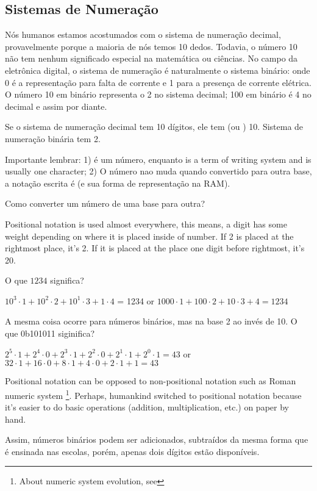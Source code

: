 \subsection{Sistemas de Numeração}

Nós humanos estamos acostumados com o sistema de numeração decimal, provavelmente porque a maioria de nós temos 10 dedos.
Todavia, o número 10 não tem nenhum significado especial na matemática ou ciências.
No campo da eletrônica digital, o sistema de numeração é naturalmente o sistema binário: onde 0 é a representação para falta de corrente e 1 para a presença de corrente elétrica.
O número 10 em binário representa o 2 no sistema decimal; 100 em binário é 4 no decimal e assim por diante.

Se o sistema de numeração decimal tem 10 dígitos, ele tem  (ou ) 10.
Sistema de numeração binária tem   2.

Importante lembrar:
1)  é um número, enquanto  is a term of writing system and is usually one character;
2) O número nao muda quando convertido para outra base, a notação escrita é (e sua forma de representação na \ac{RAM}).

Como converter um número de uma base para outra?

Positional notation is used almost everywhere, this means, a digit has some weight depending on where it is placed inside of number.
If 2 is placed at the rightmost place, it's 2.
If it is placed at the place one digit before rightmost, it's 20.

O que $1234$ significa?

$10^3 \cdot 1 + 10^2 \cdot 2 + 10^1 \cdot 3 + 1 \cdot 4$ = 1234 or
$1000 \cdot 1 + 100 \cdot 2 + 10 \cdot 3 + 4 = 1234$

A mesma coisa ocorre para números binários, mas na base 2 ao invés de 10.
O que 0b101011 siginifica?

$2^5 \cdot 1 + 2^4 \cdot 0 + 2^3 \cdot 1 + 2^2 \cdot 0 + 2^1 \cdot 1 + 2^0 \cdot 1 = 43$ or
$32 \cdot 1 + 16 \cdot 0 + 8 \cdot 1 + 4 \cdot 0 + 2 \cdot 1 + 1 = 43$

Positional notation can be opposed to non-positional notation such as Roman numeric system
\footnote{About numeric system evolution, see }.
Perhaps, humankind switched to positional notation because it's easier to do basic operations (addition, multiplication, etc.) on paper by hand.

Assim, números binários podem ser adicionados, subtraídos da mesma forma que é ensinada nas escolas, porém, apenas dois dígitos estão disponíveis.

